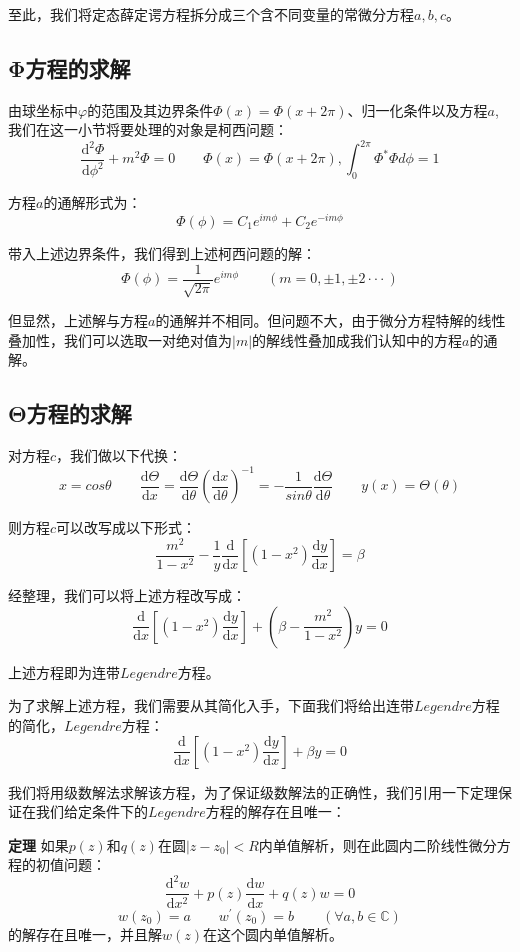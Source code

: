 至此，我们将定态薛定谔方程拆分成三个含不同变量的常微分方程$a,b,c$。
\subsection{Φ方程的求解}
由球坐标中$\varphi$的范围及其边界条件$\varPhi(x)=\varPhi(x+2\pi)$、归一化条件以及方程$a$,我们在这一小节将要处理的对象是柯西问题：
\[\frac{\mathrm{d}^2 \varPhi}{\mathrm{d}{\phi^2}}+ m^2 \varPhi=0 \qquad \varPhi(x)=\varPhi(x+2\pi) ,\int_{0}^{2\pi}\varPhi^{*}\varPhi d\phi=1\]

方程$a$的通解形式为：
\[\varPhi(\phi)=C_1 e^{im\phi}+C_2 e^{-im\phi}\]

带入上述边界条件，我们得到上述柯西问题的解：
\[\varPhi(\phi)=\frac{1}{\sqrt{2\pi}}e^{im\phi} \qquad (m=0,\pm 1,\pm 2\cdot\cdot\cdot)\]

但显然，上述解与方程$a$的通解并不相同。但问题不大，由于微分方程特解的线性叠加性，我们可以选取一对绝对值为$|m|$的解线性叠加成我们认知中的方程$a$的通解。

\subsection{Θ方程的求解}
对方程$c$，我们做以下代换：
\[x=cos\theta \qquad \frac{\mathrm{d} \Theta}{\mathrm{d} x}=\frac{\mathrm{d} \Theta}{\mathrm{d} \theta}\left ( \frac{\mathrm{d} x}{\mathrm{d} \theta} \right )^{-1}=-\frac{1}{sin\theta} \frac{\mathrm{d} \Theta}{\mathrm{d} \theta} \qquad y(x)=\Theta(\theta)\]

则方程$c$可以改写成以下形式：
\[\frac{m^2}{1-x^2}-\frac{1}{y}\frac{\mathrm{d}}{\mathrm{d}{x}} \left [(1-x^2) \frac{\mathrm{d} y}{\mathrm{d}{x}} \right ]=\beta\]

经整理，我们可以将上述方程改写成：
\[\frac{\mathrm{d}}{\mathrm{d}{x}} \left [(1-x^2) \frac{\mathrm{d} y}{\mathrm{d}{x}} \right ]+\left (\beta- \frac{m^2}{1-x^2} \right )y=0\]

上述方程即为连带$Legendre$方程。

为了求解上述方程，我们需要从其简化入手，下面我们将给出连带$Legendre$方程的简化，$Legendre$方程：
\[\frac{\mathrm{d}}{\mathrm{d}{x}} \left [(1-x^2) \frac{\mathrm{d} y}{\mathrm{d}{x}} \right ]+\beta y=0\]

我们将用级数解法求解该方程，为了保证级数解法的正确性，我们引用一下定理保证在我们给定条件下的$Legendre$方程的解存在且唯一：

\textbf{定理} \qquad 如果$p(z)$和$q(z)$在圆$|z-z_0|<R$内单值解析，则在此圆内二阶线性微分方程的初值问题：
\[\frac{\mathrm{d}^2w}{\mathrm{d}x^2}+p(z)\frac{\mathrm{d}w}{\mathrm{d}x}+q(z)w=0\]
\[w(z_0)=a \qquad w^{'}(z_0)=b \qquad (\forall a,b \in \mathbb{C})\]
的解存在且唯一，并且解$w(z)$在这个圆内单值解析。

